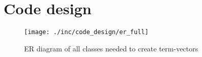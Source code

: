 


\section{Code design}

\begin{figure}[h]
    \texttt{[image: ./inc/code\_design/er\_full]}
    \caption{ER diagram of all classes needed to create term-vectors}
\end{figure}
